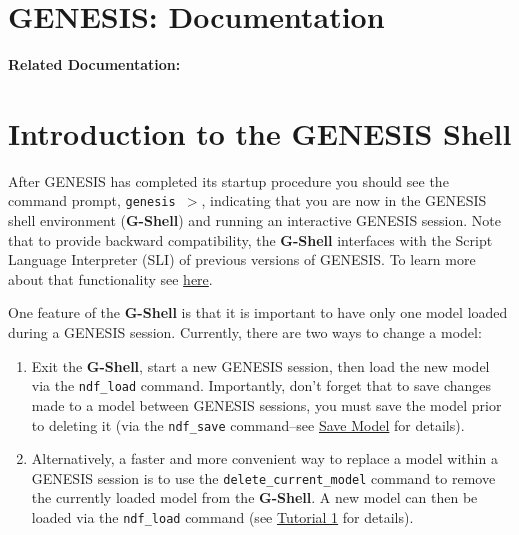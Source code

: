 \documentclass[12pt]{article}
\begin{document}
\section*{GENESIS: Documentation}

{\bf Related Documentation:}

\section*{Introduction to the GENESIS Shell}

After GENESIS has completed its startup procedure you should see the command prompt, {\tt genesis $>$}, indicating that you are now in the GENESIS shell environment ({\bf G-Shell}) and running an interactive GENESIS session. Note that to provide backward compatibility, the {\bf G-Shell} interfaces with the Script Language Interpreter (SLI) of previous versions of GENESIS. To learn more about that functionality see \href{../backward-compatibility/backward-compatibility.tex}{here}.

One feature of the {\bf G-Shell} is that it is important to have only one model loaded during a GENESIS session. Currently, there are two ways to change a model:

\begin{enumerate}

\item Exit the {\bf G-Shell}, start a new GENESIS session, then load the new model  via the {\tt ndf\_load} command. Importantly, don't forget that to save changes made to a model between GENESIS sessions, you must save the model prior to deleting it (via the {\tt ndf\_save} command--see \href{../tutorial1/tutorial1.tex}{Save Model} for details).

\item Alternatively, a faster and more convenient way to replace a model within a GENESIS session is to use the {\tt delete\_current\_model} command to remove the currently loaded model from the {\bf G-Shell}. A new model can then be loaded via the {\tt ndf\_load} command (see \href{../tutorial1/tutorial1.tex}{Tutorial 1} for details).

\end{enumerate}
\end{document}
